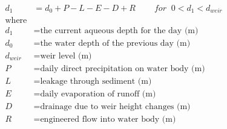 \documentclass[fleqn, oneside, 11pt]{article}%
\begin{document}
\begin{preview}
\begin{align*}%
d_{1} & = d_{0}+P-L-E-D+R \;\;\;\;\;\;\;\;   for \;\; 0<d_{1}<d_{weir} \\ 
\text{where} \nonumber \\
d_{1} & =  \text{the current aqueous depth for the day (m)} \nonumber \\
d_{0} & =  \text{the water depth of the previous day (m)} \nonumber \\
d_{weir} & =  \text{weir level (m)} \nonumber \\
P & =  \text{daily direct precipitation on water body (m)} \nonumber \\
L & =  \text{leakage through sediment (m)} \nonumber \\
E & =  \text{daily evaporation of runoff (m)} \nonumber \\
D & =  \text{drainage due to weir height changes (m)} \nonumber \\
R & =  \text{engineered flow into water body (m)} \nonumber \\
\end{align*} 
\end{preview}
\end{document}
